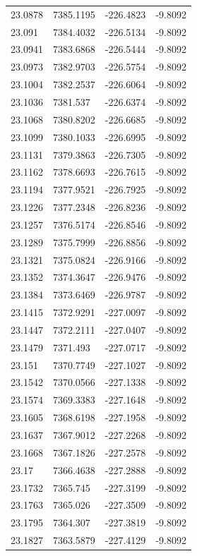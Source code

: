 \begin{table}[H]
\begin{tabular}{llll}
23.0878 & 7385.1195 & -226.4823 & -9.8092 \\
23.091 & 7384.4032 & -226.5134 & -9.8092 \\
23.0941 & 7383.6868 & -226.5444 & -9.8092 \\
23.0973 & 7382.9703 & -226.5754 & -9.8092 \\
23.1004 & 7382.2537 & -226.6064 & -9.8092 \\
23.1036 & 7381.537 & -226.6374 & -9.8092 \\
23.1068 & 7380.8202 & -226.6685 & -9.8092 \\
23.1099 & 7380.1033 & -226.6995 & -9.8092 \\
23.1131 & 7379.3863 & -226.7305 & -9.8092 \\
23.1162 & 7378.6693 & -226.7615 & -9.8092 \\
23.1194 & 7377.9521 & -226.7925 & -9.8092 \\
23.1226 & 7377.2348 & -226.8236 & -9.8092 \\
23.1257 & 7376.5174 & -226.8546 & -9.8092 \\
23.1289 & 7375.7999 & -226.8856 & -9.8092 \\
23.1321 & 7375.0824 & -226.9166 & -9.8092 \\
23.1352 & 7374.3647 & -226.9476 & -9.8092 \\
23.1384 & 7373.6469 & -226.9787 & -9.8092 \\
23.1415 & 7372.9291 & -227.0097 & -9.8092 \\
23.1447 & 7372.2111 & -227.0407 & -9.8092 \\
23.1479 & 7371.493 & -227.0717 & -9.8092 \\
23.151 & 7370.7749 & -227.1027 & -9.8092 \\
23.1542 & 7370.0566 & -227.1338 & -9.8092 \\
23.1574 & 7369.3383 & -227.1648 & -9.8092 \\
23.1605 & 7368.6198 & -227.1958 & -9.8092 \\
23.1637 & 7367.9012 & -227.2268 & -9.8092 \\
23.1668 & 7367.1826 & -227.2578 & -9.8092 \\
23.17 & 7366.4638 & -227.2888 & -9.8092 \\
23.1732 & 7365.745 & -227.3199 & -9.8092 \\
23.1763 & 7365.026 & -227.3509 & -9.8092 \\
23.1795 & 7364.307 & -227.3819 & -9.8092 \\
23.1827 & 7363.5879 & -227.4129 & -9.8092 \\

\end{tabular}
\end{table}
